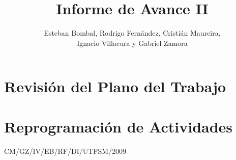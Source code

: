 \documentclass[12pt,letterpaper]{article}
\title{Informe de Avance II}
\author{Esteban Bombal, Rodrigo Fernández, Cristián Maureira,\\Ignacio Villacura y Gabriel Zamora}
\begin{document}

\maketitle\thispagestyle{empty}

\section{Revisión del Plano del Trabajo}
\label{op:revision}


\newpage
\section{Reprogramación de Actividades}
\label{target:reprogramacion}


\vfill \hfill CM/GZ/IV/EB/RF/DI/UTFSM/2009
\end{document}
